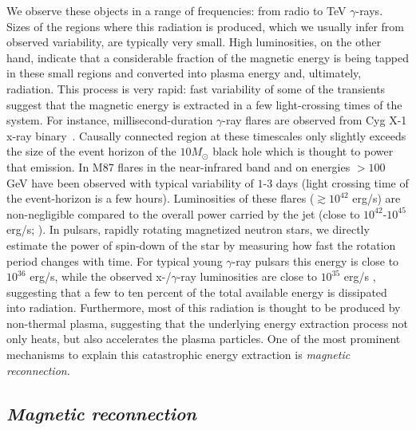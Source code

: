 We observe these objects in a range of frequencies: from radio to TeV $\gamma$-rays. Sizes of the regions where this radiation is produced, which we usually infer from observed variability, are typically very small. High luminosities, on the other hand, indicate that a considerable fraction of the magnetic energy is being tapped in these small regions and converted into plasma energy and, ultimately, radiation. This process is very rapid: fast variability of some of the transients suggest that the magnetic energy is extracted in a few light-crossing times of the system. For instance, millisecond-duration $\gamma$-ray flares are observed from Cyg X-1 x-ray binary~\citep{2003MNRAS.343L..84G}. Causally connected region at these timescales only slightly exceeds the size of the event horizon of the $10 M_\odot$ black hole which is thought to power that emission. In M87 flares in the near-infrared band and on energies $>100$ GeV have been observed with typical variability of $1\text{-}3$ days \citep{2006Sci...314.1424A,2012ApJ...746..151A} (light crossing time of the event-horizon is a few hours). Luminosities of these flares ($\gtrsim 10^{42}$ erg/s) are non-negligible compared to the overall power carried by the jet (close to $10^{42}\text{-}10^{45}$ erg/s; \citealt{2012ApJ...746..151A,2016MNRAS.457.3801P}). In pulsars, rapidly rotating magnetized neutron stars, we directly estimate the power of spin-down of the star by measuring how fast the rotation period changes with time. For typical young $\gamma$-ray pulsars this energy is close to $10^{36}$ erg/s, while the observed x-/$\gamma$-ray luminosities are close to $10^{35}$ erg/s \citep{2013ApJS..208...17A}, suggesting that a few to ten percent of the total available energy is dissipated into radiation. Furthermore, most of this radiation is thought to be produced by non-thermal plasma, suggesting that the underlying energy extraction process not only heats, but also accelerates the plasma particles. One of the most prominent mechanisms to explain this catastrophic energy extraction is \emph{magnetic reconnection}. 

\subsection*{\small \it Magnetic reconnection}


